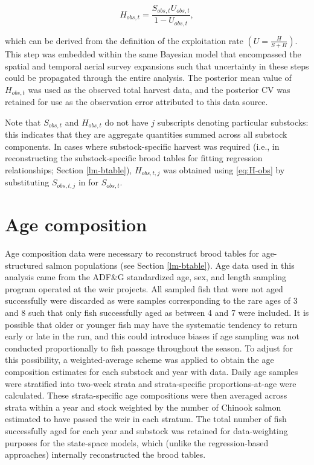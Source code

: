 \documentclass[12pt,]{book}
\theoremstyle{definition}
\theoremstyle{definition}
\theoremstyle{definition}
\theoremstyle{remark}
\begin{document}
\begin{equation}
  H_{obs,t} = \frac{S_{obs,t} U_{obs,t}}{1-U_{obs,t}},
  \label{eq:H-obs}
\end{equation}

\noindent
which can be derived from the definition of the exploitation rate
\(\left(U = \frac{H}{S+H}\right)\). This step was embedded within the
same Bayesian model that encompassed the spatial and temporal aerial
survey expansions such that uncertainty in these steps could be
propagated through the entire analysis. The posterior mean value of
\(H_{obs,t}\) was used as the observed total harvest data, and the
posterior CV was retained for use as the observation error attributed to
this data source.

Note that \(S_{obs,t}\) and \(H_{obs,t}\) do not have \(j\) subscripts
denoting particular substocks: this indicates that they are aggregate
quantities summed across all substock components. In cases where
substock-specific harvest was required (i.e., in reconstructing the
substock-specific brood tables for fitting regression relationships;
Section \ref{lm-btable}), \(H_{obs,t,j}\) was obtained using
\eqref{eq:H-obs} by substituting \(S_{obs,t,j}\) in for \(S_{obs,t}\).

\section{Age composition}\label{age-comp}

\noindent
Age composition data were necessary to reconstruct brood tables for
age-structured salmon populations (see Section \ref{lm-btable}). Age
data used in this analysis came from the ADF\&G standardized age, sex,
and length sampling program operated at the weir projects. All sampled
fish that were not aged successfully were discarded as were samples
corresponding to the rare ages of 3 and 8 such that only fish
successfully aged as between 4 and 7 were included. It is possible that
older or younger fish may have the systematic tendency to return early
or late in the run, and this could introduce biases if age sampling was
not conducted proportionally to fish passage throughout the season. To
adjust for this possibility, a weighted-average scheme was applied to
obtain the age composition estimates for each substock and year with
data. Daily age samples were stratified into two-week strata and
strata-specific proportions-at-age were calculated. These
strata-specific age compositions were then averaged across strata within
a year and stock weighted by the number of Chinook salmon estimated to
have passed the weir in each stratum. The total number of fish
successfully aged for each year and substock was retained for
data-weighting purposes for the state-space models, which (unlike the
regression-based approaches) internally reconstructed the brood tables.
\end{document}
